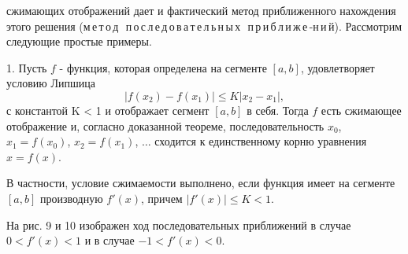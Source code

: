\documentclass[10pt]{book}
\begin{document}
	\noindent сжимающих отображений дает и фактический метод приближенного нахождения этого решения (м\,е\,т\,о\,д\, \,п\,о\,с\,л\,е\,д\,о\,в\,а\,т\,е\,л\,ь\,н\,ы\,х\, \,п\,р\,и\,б\,л\,и\,ж\,е\,-н\,и\,й). Рассмотрим следующие простые примеры.
	
	\par 1. Пусть $f$ - функция, которая определена на сегменте $[a, b]$, удовлетворяет условию Липшица
	$$|f(x_2) - f(x_1)| \leqslant K|x_2 - x_1|,$$
	с константой K < 1 и отображает сегмент $[a, b]$ в себя. Тогда $f$ есть сжимающее отображение и, согласно доказанной теореме, последовательность $x_0$, $x_1 = f(x_0)$, $x_2 = f(x_1)$, $\dots$ сходится к единственному корню уравнения $x = f(x)$.
	
	\par В частности, условие сжимаемости выполнено, если функция имеет на сегменте $[a, b]$ производную $f'(x)$, причем $|f'(x)| \leqslant K < 1$.
	
	\par На рис. 9 и 10 изображен ход последовательных приближений в случае $0 < f'(x) < 1$ и в случае $-1 < f'(x) < 0$.
	
\end{document}
